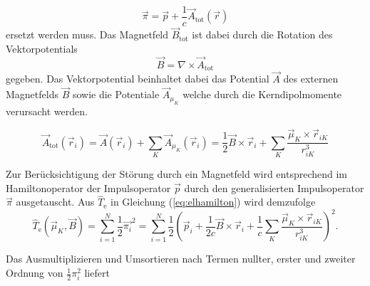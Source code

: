 	\begin{equation}
	\vec{\pi}=\vec{p}+\frac{1}{c}\vec{A}_{\textrm{tot}}(\vec{r})
	\end{equation}
	ersetzt werden muss. Das Magnetfeld $\vec{B}_{\textrm{tot}}$ ist dabei durch die Rotation des Vektorpotentials
	\begin{equation}
	\vec{B}=\nabla \times \vec{A}_{\textrm{tot}}
	\end{equation}
	gegeben. Das Vektorpotential beinhaltet dabei das Potential $\vec{A}$ des externen Magnetfelds $\vec{B}$ sowie die Potentiale $\vec{A}_{\mu_K}$ welche durch die Kerndipolmomente verursacht werden. 	 
	
	\begin{equation}\label{eq:atot}
	 \vec{A}_{\textrm{tot}}(\vec{r}_i)=\vec{A}(\vec{r}_i)+\sum_K\vec{A}_{\mu_K}(\vec{r}_i)=\frac{1}{2}\vec{B}\times \vec{r}_i +\sum_K\frac{\vec{\mu}_K\times\vec{r}_{iK}}{r_{iK}^3}
	\end{equation}
	
	Zur Berücksichtigung der Störung durch ein Magnetfeld wird entsprechend im Hamiltonoperator der Impulsoperator $\vec{p}$ durch den generalisierten Impulsoperator $\vec{\pi}$ ausgetauscht. Aus $\hat{T}_\textrm{e}$ in Gleichung (\ref{eq:elhamilton}) wird demzufolge
	\begin{equation}\label{eq:tstör}
	\hat{T}_\textrm{e}(\vec{\mu}_K,\vec{B})=\sum_{i=1}^N\frac{1}{2}\vec{\pi_i}^2=\sum_{i=1}^N\frac{1}{2}\left(\vec{p}_i+\frac{1}{2c}\vec{B}\times \vec{r}_i +\frac{1}{c}\sum_K\frac{\vec{\mu}_K\times\vec{r}_{iK}}{r_{iK}^3}\right)^2.
	\end{equation}
	
	Das Ausmultiplizieren und Umsortieren nach Termen nullter, erster und zweiter Ordnung von $\frac{1}{2}\pi_i^2$ liefert
	
